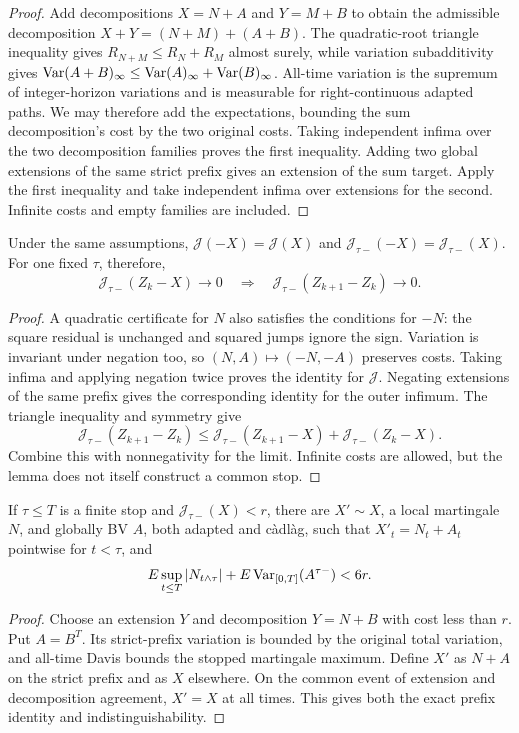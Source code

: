 \begin{proof}
Add decompositions $X=N+A$ and $Y=M+B$ to obtain the admissible
decomposition $X+Y=(N+M)+(A+B)$.
The quadratic-root triangle inequality gives $R_{N+M}\leq R_N+R_M$
almost surely, while variation subadditivity gives
$\operatorname{Var}(A+B)_\infty\leq\operatorname{Var}(A)_\infty+\operatorname{Var}(B)_\infty$.
All-time variation is the supremum of integer-horizon variations and is
measurable for right-continuous adapted paths. We may therefore add the
expectations, bounding the sum decomposition's cost by the two original
costs. Taking independent infima over the two decomposition families proves
the first inequality.
Adding two global extensions of the same strict prefix gives an extension
of the sum target. Apply the first inequality and take independent infima
over extensions for the second. Infinite costs and empty families are included.
\end{proof}
\begin{lemma}
Under the same assumptions, $\mathcal J(-X)=\mathcal J(X)$ and
$\mathcal J_{\tau-}(-X)=\mathcal J_{\tau-}(X)$.
For one fixed $\tau$, therefore,
\[
 \mathcal J_{\tau-}(Z_k-X)\longrightarrow0
 \quad\Longrightarrow\quad
 \mathcal J_{\tau-}(Z_{k+1}-Z_k)\longrightarrow0.
\]
\end{lemma}
\begin{proof}
A quadratic certificate for $N$ also satisfies the conditions for $-N$:
the square residual is unchanged and squared jumps ignore the sign.
Variation is invariant under negation too, so $(N,A)\mapsto(-N,-A)$
preserves costs. Taking infima and applying negation twice proves the
identity for $\mathcal J$. Negating extensions of the same prefix gives
the corresponding identity for the outer infimum.
The triangle inequality and symmetry give
\[
 \mathcal J_{\tau-}(Z_{k+1}-Z_k)
 \leq\mathcal J_{\tau-}(Z_{k+1}-X)+\mathcal J_{\tau-}(Z_k-X).
\]
Combine this with nonnegativity for the limit. Infinite costs are allowed,
but the lemma does not itself construct a common stop.
\end{proof}
\begin{lemma}
If $\tau\leq T$ is a finite stop and $\mathcal J_{\tau-}(X)<r$, there are
$X'\sim X$, a local martingale $N$, and globally BV $A$, both adapted and
c\`adl\`ag, such that $X'_t=N_t+A_t$ pointwise for $t<\tau$, and
\[
 E\sup_{t\leq T}|N_{t\wedge\tau}|+E\operatorname{Var}_{[0,T]}(A^{\tau-})<6r.
\]
\end{lemma}
\begin{proof}
Choose an extension $Y$ and decomposition $Y=N+B$ with cost less than $r$.
Put $A=B^T$. Its strict-prefix variation is bounded by the original total
variation, and all-time Davis bounds the stopped martingale maximum.
Define $X'$ as $N+A$ on the strict prefix and as $X$ elsewhere.
On the common event of extension and decomposition agreement, $X'=X$ at
all times. This gives both the exact prefix identity and indistinguishability.
\end{proof}
